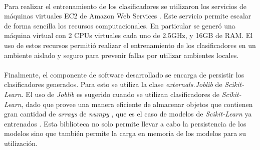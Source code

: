 \paragraph{} Para realizar el entrenamiento de los clasificadores se utilizaron los servicios de máquinas virtuales EC2 de Amazon Web Services \cite{aws}.
Este servicio permite escalar de forma sencilla los recursos computacionales.
En particular se generó una máquina virtual con 2 CPUs virtuales cada uno de 2.5GHz, y 16GB de RAM.
El uso de estos recursos permitió realizar el entrenamiento de los clasificadores en un ambiente aislado y seguro para prevenir fallas por utilizar ambientes locales. 

\paragraph{} Finalmente, el componente de software desarrollado se encarga de persistir los clasificadores generados.
Para esto se utiliza la clase \textit{externals.Joblib} de \textit{Scikit-Learn}.
El uso de \textit{Joblib} es sugerido cuando se utilizan clasificadores de \textit{Scikit-Learn}, dado que provee una manera eficiente de almacenar objetos que contienen gran cantidad de \textit{arrays} de \textit{numpy} \cite{numpy}, que es el caso de modelos de \textit{Scikit-Learn} ya entrenados \cite{persistence}.
Esta biblioteca no solo permite llevar a cabo la persistencia de los modelos sino que también permite la carga en memoria de los modelos para su utilización.


